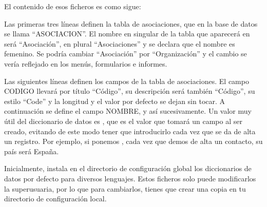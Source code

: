 El contenido de esos ficheros es como sigue:



\begin{center}
\begin{minipage}{16.249cm}




\bigskip






\end{minipage}
\end{center}

\bigskip


\bigskip


\bigskip


\bigskip


\bigskip


\bigskip


\bigskip


\bigskip


\bigskip


\bigskip

Las primeras tres líneas definen la tabla de asociaciones, que en la
base de datos se llama
{\textquotedblleft}ASOCIACION{\textquotedblright}. El nombre en
singular de la tabla que aparecerá en \appname será
{\textquotedblleft}Asociación{\textquotedblright}, en plural
{\textquotedblleft}Asociaciones{\textquotedblright} y se declara que el
nombre es femenino. Se podría cambiar
{\textquotedblleft}Asociación{\textquotedblright} por
{\textquotedblleft}Organización{\textquotedblright} y el cambio se
vería reflejado en los menús, formularios e informes.

Las siguientes líneas definen los campos de la tabla de asociaciones.
El campo CODIGO llevará por título
{\textquotedblleft}Código{\textquotedblright}, su descripción
será también {\textquotedblleft}Código{\textquotedblright}, su
estilo {\textquotedblleft}Code{\textquotedblright} y la longitud y el
valor por defecto se dejan sin tocar. A continuación se define el
campo NOMBRE, y así sucesivamente. Un valor muy útil del
diccionario de datos es , que es el
valor que tomará un campo al ser creado, evitando de este modo tener
que introducirlo cada vez que se da de alta un registro. Por ejemplo,
si ponemos ,
cada vez que demos de alta un contacto, su país será España.

Inicialmente, \appname instala en el directorio de configuración
global los diccionarios de datos por defecto para diversos lenguajes.
Estos ficheros solo puede modificarlos la superusuaria, por lo que para
cambiarlos, tienes que crear una copia en tu directorio de
configuración local.
